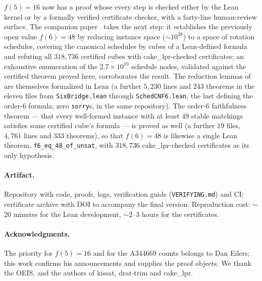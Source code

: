 \documentclass[11pt]{article}
\begin{document}
$f(5)=16$ now has a proof whose every step is checked either by the Lean kernel or by a
formally verified certificate checker, with a forty-line human-review surface. The companion
paper~\cite{f6paper} takes the next step: it establishes the previously open value $f(6)=48$
by reducing instance space ($\sim\!10^{28}$) to a space of rotation schedules, covering the
canonical schedules by cubes of a Lean-defined formula and refuting all $318{,}736$ certified
cubes with cake\_lpr-checked certificates; an exhaustive enumeration of the
$2.7\times 10^{10}$ schedule nodes, validated against the certified theorem proved here,
corroborates the result. The reduction lemmas of~\cite{f6paper} are themselves formalized in
Lean (a further $5{,}230$ lines and $243$ theorems in the eleven files from
\texttt{SixBridge.lean} through \texttt{SchedCNF6.lean}, the last defining the order-6
formula; zero \texttt{sorry}s, in the same repository). The order-6 faithfulness theorem ---
that every well-formed instance with at least $49$ stable matchings satisfies some certified
cube's formula --- is proved as well (a further $19$ files, $4{,}761$ lines and $333$
theorems), so that $f(6)=48$ is likewise a single Lean theorem,
\texttt{f6\_eq\_48\_of\_unsat}, with $318{,}736$ cake\_lpr-checked certificates as its only
hypothesis.

\paragraph{Artifact.} Repository with code, proofs, logs, verification guide
(\texttt{VERIFYING.md}) and CI; certificate archive with DOI to accompany the final version.
Reproduction cost: $\sim$20 minutes for the Lean development, $\sim$2--3 hours for the
certificates.

\paragraph{Acknowledgments.} The priority for $f(5)=16$ and for the A344669 counts belongs to
Dan Eilers; this work confirms his announcements and supplies the proof objects. We thank the
OEIS, and the authors of \textsf{kissat}, \textsf{drat-trim} and \textsf{cake\_lpr}.
\end{document}
